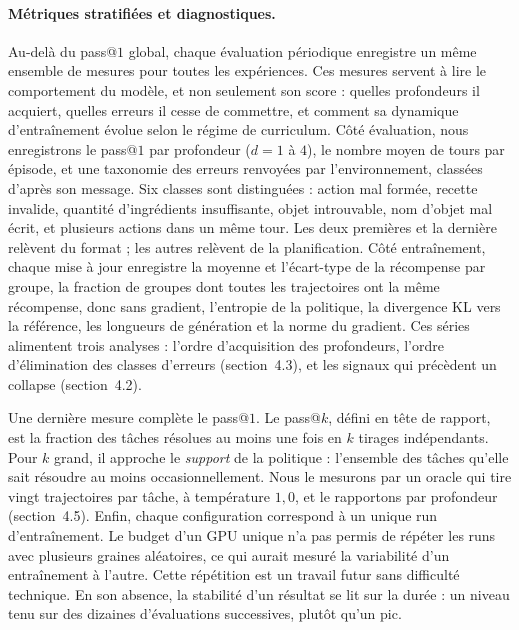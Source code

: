 \documentclass[11pt,a4paper]{article}
\begin{document}
\paragraph{Métriques stratifiées et diagnostiques.} Au-delà du pass@$1$ global, chaque évaluation périodique enregistre un même ensemble de mesures pour toutes les expériences. Ces mesures servent à lire le comportement du modèle, et non seulement son score : quelles profondeurs il acquiert, quelles erreurs il cesse de commettre, et comment sa dynamique d'entraînement évolue selon le régime de curriculum. Côté évaluation, nous enregistrons le pass@$1$ par profondeur ($d=1$ à $4$), le nombre moyen de tours par épisode, et une taxonomie des erreurs renvoyées par l'environnement, classées d'après son message. Six classes sont distinguées : action mal formée, recette invalide, quantité d'ingrédients insuffisante, objet introuvable, nom d'objet mal écrit, et plusieurs actions dans un même tour. Les deux premières et la dernière relèvent du format ; les autres relèvent de la planification. Côté entraînement, chaque mise à jour enregistre la moyenne et l'écart-type de la récompense par groupe, la fraction de groupes dont toutes les trajectoires ont la même récompense, donc sans gradient, l'entropie de la politique, la divergence KL vers la référence, les longueurs de génération et la norme du gradient. Ces séries alimentent trois analyses : l'ordre d'acquisition des profondeurs, l'ordre d'élimination des classes d'erreurs (section~4.3), et les signaux qui précèdent un collapse (section~4.2).

Une dernière mesure complète le pass@$1$. Le pass@$k$, défini en tête de rapport, est la fraction des tâches résolues au moins une fois en $k$ tirages indépendants. Pour $k$ grand, il approche le \emph{support} de la politique : l'ensemble des tâches qu'elle sait résoudre au moins occasionnellement. Nous le mesurons par un oracle qui tire vingt trajectoires par tâche, à température $1{,}0$, et le rapportons par profondeur (section~4.5). Enfin, chaque configuration correspond à un unique run d'entraînement. Le budget d'un GPU unique n'a pas permis de répéter les runs avec plusieurs graines aléatoires, ce qui aurait mesuré la variabilité d'un entraînement à l'autre. Cette répétition est un travail futur sans difficulté technique. En son absence, la stabilité d'un résultat se lit sur la durée : un niveau tenu sur des dizaines d'évaluations successives, plutôt qu'un pic.
\end{document}
